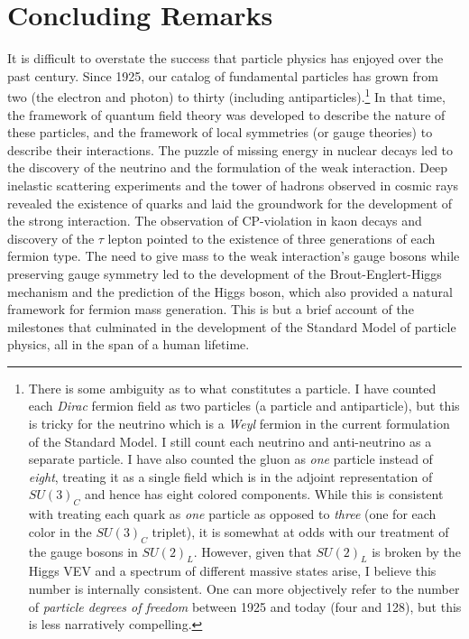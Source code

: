 \chapter{Concluding Remarks}

It is difficult to overstate the success that particle physics has enjoyed over the past century. Since 1925, our catalog of fundamental particles has grown from two (the electron and photon) to thirty (including antiparticles).\footnote{There is some ambiguity as to what constitutes a particle. I have counted each {\it Dirac} fermion field as two particles (a particle and antiparticle), but this is tricky for the neutrino which is a {\it Weyl} fermion in the current formulation of the Standard Model. I still count each neutrino and anti-neutrino as a separate particle. I have also counted the gluon as {\it one} particle instead of {\it eight}, treating it as a single field which is in the adjoint representation of $SU(3)_C$ and hence has eight colored components. While this is consistent with treating each quark as {\it one} particle as opposed to {\it three} (one for each color in the $SU(3)_C$ triplet), it is somewhat at odds with our treatment of the gauge bosons in $SU(2)_L$. However, given that $SU(2)_L$ is broken by the Higgs VEV and a spectrum of different massive states arise, I believe this number is internally consistent. One can more objectively refer to the number of {\it particle degrees of freedom} between 1925 and today (four and 128), but this is less narratively compelling.} In that time, the framework of quantum field theory was developed to describe the nature of these particles, and the framework of local symmetries (or gauge theories) to describe their interactions. The puzzle of missing energy in nuclear decays led to the discovery of the neutrino and the formulation of the weak interaction. Deep inelastic scattering experiments and the tower of hadrons observed in cosmic rays revealed the existence of quarks and laid the groundwork for the development of the strong interaction. The observation of CP-violation in kaon decays and discovery of the $\tau$ lepton pointed to the existence of three generations of each fermion type. The need to give mass to the weak interaction's gauge bosons while preserving gauge symmetry led to the development of the Brout-Englert-Higgs mechanism and the prediction of the Higgs boson, which also provided a natural framework for fermion mass generation. This is but a brief account of the milestones that culminated in the development of the Standard Model of particle physics, all in the span of a human lifetime. 

